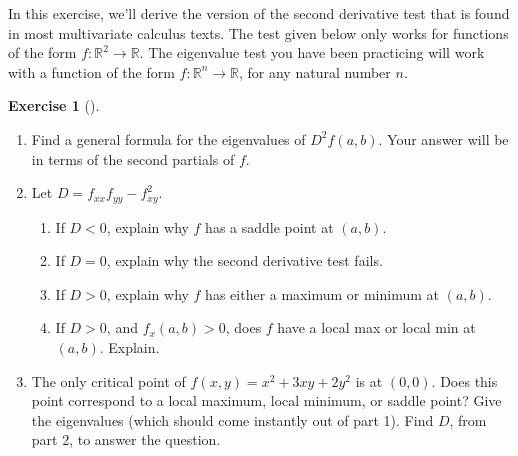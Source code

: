 \documentclass[10pt,]{book}
\theoremstyle{plain}
\theoremstyle{definition}
\theoremstyle{definition}
\theoremstyle{definition}
\theoremstyle{definition}
\newtheorem{exploration}[project]{Exercise}
\theoremstyle{definition}
\numberwithin{equation}{section}
\newcommand{\lt}{<}
\begin{document}
In this exercise, we'll derive the version of the second derivative test that is found in most multivariate calculus texts. The test given below only works for functions of the form \(f:\mathbb{R}^2\to\mathbb{R}\). The eigenvalue test you have been practicing will work with a function of the form \(f:\mathbb{R}^n\to\mathbb{R}\), for any natural number \(n\).%
\begin{exploration}[]\label{exploration-239}
\leavevmode%
\begin{enumerate}[font=\bfseries,label=(\alph*),ref=\alph*]
\item\label{task-643} Find a general formula for the eigenvalues of \(D^2f(a,b)\). Your answer will be in terms of the second partials of \(f\).%
\item\label{task-644} Let \(D=f_{xx}f_{yy}-f_{xy}^2\). \leavevmode%
\begin{itemize}[label=\textbullet]
\begin{enumerate}[font=\bfseries,label=(\alph*),ref=\alph*]
\item\label{task-645} If \(D\lt 0\), explain why \(f\) has a saddle point at \((a,b)\).%
\item\label{task-646} If \(D=0\), explain why the second derivative test fails.%
\item\label{task-647} If \(D>0\), explain why \(f\) has either a maximum or minimum at \((a,b)\).%
\item\label{task-648} If \(D>0\), and \(f_x(a,b)>0\), does \(f\) have a local max or local min at \((a,b)\). Explain.%
\end{enumerate}
\end{itemize}
%
\item\label{task-649} The only critical point of \(f(x,y) = x^2+3xy+2y^2\) is at \((0,0)\).  Does this point correspond to a local maximum, local minimum, or saddle point? Give the eigenvalues (which should come instantly out of part 1). Find \(D\), from part 2, to answer the question.%
\end{enumerate}
\end{exploration}
\typeout{************************************************}
\typeout{************************************************}
\end{document}
